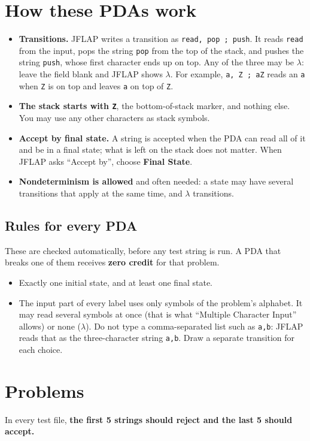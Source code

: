 \documentclass[11pt]{article}
\newcommand{\tr}[3]{\texttt{#1, #2 ; #3}}
\begin{document}
\section*{How these PDAs work}

\begin{itemize}
  \item \textbf{Transitions.} JFLAP writes a transition as \tr{read}{pop}{push}. It reads
        \texttt{read} from the input, pops the string \texttt{pop} from the top of the stack, and
        pushes the string \texttt{push}, whose first character ends up on top. Any of the three
        may be $\lambda$: leave the field blank and JFLAP shows $\lambda$. For example,
        \tr{a}{Z}{aZ} reads an \texttt{a} when \texttt{Z} is on top and leaves \texttt{a} on top
        of \texttt{Z}.
  \item \textbf{The stack starts with \texttt{Z}}, the bottom-of-stack marker, and nothing else.
        You may use any other characters as stack symbols.
  \item \textbf{Accept by final state.} A string is accepted when the PDA can read all of it and
        be in a final state; what is left on the stack does not matter. When JFLAP asks
        ``Accept by'', choose \textbf{Final State}.
  \item \textbf{Nondeterminism is allowed} and often needed: a state may have several
        transitions that apply at the same time, and $\lambda$ transitions.
\end{itemize}

\subsection*{Rules for every PDA}
These are checked automatically, before any test string is run. A PDA that breaks one of them
receives \textbf{zero credit} for that problem.
\begin{itemize}
  \item Exactly one initial state, and at least one final state.
  \item The input part of every label uses only symbols of the problem's alphabet. It may read
        several symbols at once (that is what ``Multiple Character Input'' allows) or none
        ($\lambda$). Do not type a comma-separated list such as \texttt{a,b}: JFLAP reads that as
        the three-character string \texttt{a,b}. Draw a separate transition for each choice.
\end{itemize}

\section*{Problems}
In every test file, \textbf{the first 5 strings should reject and the last 5 should accept.}
\end{document}
